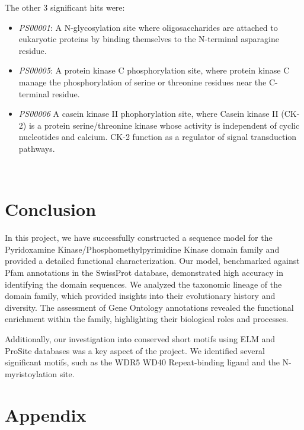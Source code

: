 \documentclass[10pt,twocolumn,letterpaper]{article}
\begin{document}
The other 3 significant hits were: 
\begin{itemize}
\item \textit{PS00001}: A N-glycosylation site where oligosaccharides are attached to eukaryotic proteins by binding themselves to the N-terminal asparagine residue.\cite{N-glycosylation}
\item \textit{PS00005}: A protein kinase C phosphorylation site, where protein kinase C manage the phosphorylation of serine or threonine residues near the C-terminal residue.\cite{kinase}
\item \textit{PS00006} A casein kinase II phophorylation site, where Casein kinase II (CK-2) is a protein serine/threonine kinase whose activity is independent of cyclic nucleotides and calcium. CK-2 function as a regulator of signal transduction pathways.\cite{kinase2}
\end{itemize} \\

\section{Conclusion}

In this project, we have successfully constructed a sequence model for the Pyridoxamine Kinase/Phosphomethylpyrimidine Kinase domain family and provided a detailed functional characterization. Our model, benchmarked against Pfam annotations in the SwissProt database, demonstrated high accuracy in identifying the domain sequences. We analyzed the taxonomic lineage of the domain family, which provided insights into their evolutionary history and diversity. The assessment of Gene Ontology annotations revealed the functional enrichment within the family, highlighting their biological roles and processes.

Additionally, our investigation into conserved short motifs using ELM and ProSite databases was a key aspect of the project. We identified several significant motifs, such as the WDR5 WD40 Repeat-binding ligand and the N-myristoylation site.



{\small


}

\clearpage %
\onecolumn %

\section{Appendix}
\end{document}

